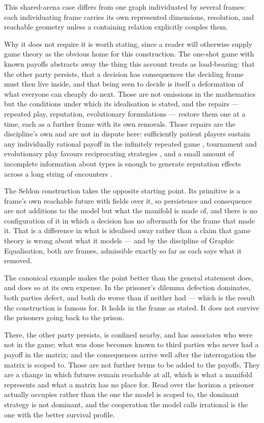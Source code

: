 \documentclass[11pt,a4paper]{article}
\theoremstyle{remark}
\begin{document}
This shared-arena case differs from one graph individuated by several frames: each individuating frame carries its own represented dimensions, resolution, and reachable geometry unless a containing relation explicitly couples them.

Why it does not require it is worth stating, since a reader will otherwise supply game theory as the
obvious home for this construction. The one-shot game with known payoffs abstracts away the thing
this account treats as load-bearing: that the other party persists, that a decision has consequences
the deciding frame must then live inside, and that being seen to decide is itself a deformation of
what everyone can cheaply do next. Those are not omissions in the mathematics but the conditions
under which its idealisation is stated, and the repairs --- repeated play, reputation, evolutionary
formulations --- restore them one at a time, each as a further frame with its own removals. Those
repairs are the discipline's own and are not in dispute here: sufficiently patient players sustain any
individually rational payoff in the infinitely repeated game \citep{fudenberg1986}, tournament and
evolutionary play favours reciprocating strategies \citep{axelrod1984}, and a small amount of
incomplete information about types is enough to generate reputation effects across a long string of
encounters \citep{kreps1982}.

The Seldon construction takes the opposite starting point. Its primitive is a frame's own reachable
future with fields over it, so persistence and consequence are not additions to the model but what
the manifold is made of, and there is no configuration of it in which a decision has no aftermath for
the frame that made it. That is a difference in what is idealised away rather than a claim that game
theory is wrong about what it models --- and by the discipline of Graphic Equalisation, both are
frames, admissible exactly so far as each says what it removed.

The canonical example makes the point better than the general statement does, and does so at its own
expense. In the prisoner's dilemma defection dominates, both parties defect, and both do worse than
if neither had --- which is the result the construction is famous for. It holds in the frame as
stated. It does not survive the prisoners going back to the prison.

There, the other party persists, is confined nearby, and has associates who were not in the game;
what was done becomes known to third parties who never had a payoff in the matrix; and the
consequences arrive well after the interrogation the matrix is scoped to. Those are not further terms
to be added to the payoffs. They are a change in which futures remain reachable at all, which is
what a manifold represents and what a matrix has no place for. Read over the horizon a prisoner
actually occupies rather than the one the model is scoped to, the dominant strategy is not dominant,
and the cooperation the model calls irrational is the one with the better survival profile.
\end{document}
